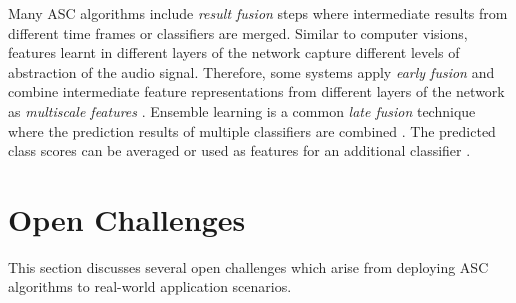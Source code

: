 \documentclass[applsci,article,submit,oneauthor,pdftex]{Definitions/mdpi}
\begin{document}
Many ASC algorithms include \textit{result fusion} steps where intermediate results from different time frames or classifiers are merged.
Similar to computer visions, features learnt in different layers of the network capture different levels of abstraction of the audio signal. Therefore, some systems apply \textit{early fusion} and combine intermediate feature representations from different layers of the network as \textit{multiscale features} \citep{Yang:2018:MultiScaleFeatures:DCASE, Singh:2019:MultiViewFeatures:DCASE, Singh:2018:EnsembleASC:EUSIPCO}.
Ensemble learning is a common \textit{late fusion} technique where the prediction results of multiple classifiers are combined \citep{Ren:2017:DeepSequentialASC:DCASE, Fonseca:2017:ASC:DACSE, Nguyen:2018:ASCEnsemble:DCASE, Huang:2019:ASCEnsemble:DCASE, Mars:2019:BinauralASC:DCASE}.
The predicted class scores can be averaged \citep{Zeinali:2018:XVektorEmbeddings:DCASE} or used as features for an additional classifier  \citep{Weiping:2017:SpectrogramFusion:DCASE}.
%
%
%

\section{Open Challenges}
\label{sec:open_challenges}

This section discusses several open challenges which arise from deploying ASC algorithms to real-world application scenarios.

\end{document}
